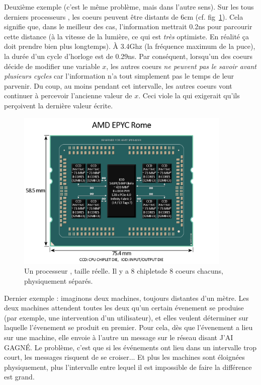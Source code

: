 Deuxième exemple (c'est le même problème, mais dans l'autre sens). Sur les tous
derniers processeurs , les coeurs peuvent être
distants de 6cm (cf. fig~\ref{fig:ROME}). Cela signifie que, dans le meilleur
des cas, l'information mettrait 0.2ns pour parcourir cette distance (à la
vitesse de la lumière, ce qui est \emph{très} optimiste. En réalité ça doit
prendre bien plus longtemps). À 3.4Ghz (la fréquence maximum de la puce), la
durée d'un cycle d'horloge est de 0.29ns. Par conséquent, lorsqu'un des coeurs
décide de modifier une variable $x$, les autres coeurs \emph{ne peuvent pas le
  savoir avant plusieurs cycles} car l'information n'a tout simplement pas le
temps de leur parvenir. Du coup, au moins pendant cet intervalle, les autres
coeurs vont continuer à percevoir l'ancienne valeur de $x$. Ceci viole la
 qui exigerait qu'ils perçoivent la dernière valeur
écrite.

\begin{figure}
  \centering
  \includegraphics[width=10.24cm]{epyc_rome.png}
  \caption{Un processeur , taille réelle. Il y a 8 \og
    chiplets\fg de 8 coeurs chacuns, physiquement séparés. \label{fig:ROME}}
\end{figure}

Dernier exemple : imaginons deux machines, toujours distantes d'un mètre. Les
deux machines attendent toutes les deux qu'un certain évenement se produise (par
exemple, une intervention d'un utilisateur), et elles veulent déterminer sur
laquelle l'évenement se produit en premier. Pour cela, dès que l'évenement a
lieu sur une machine, elle envoie à l'autre un message sur le réseau disant \og
J'AI GAGNÉ\fg. Le problème, c'est que si les événements ont lieu dans un
intervalle trop court, les messages risquent de se croiser... Et plus les
machines sont éloignées physiquement, plus l'intervalle entre lequel il est
impossible de faire la différence est grand.

